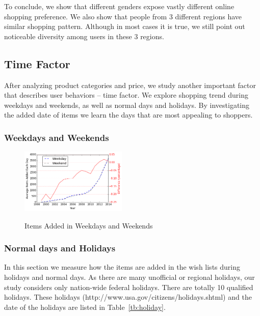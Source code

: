 To conclude, we show that different genders expose vastly different online shopping preference. We also show that people from 3 different regions have similar shopping pattern. Although in most cases it is true, we still point out noticeable diversity among users in these 3 regions. 

\subsection{Time Factor}
After analyzing product categories and price, we study another important factor that describes user behaviors -- time factor. We explore shopping trend during weekdays and weekends, as well as normal days and holidays. By investigating the added date of items we learn the days that are most appealing to shoppers. 

\subsubsection{Weekdays and Weekends}



\begin{figure}[h!]
\centering
  \caption{Items Added in Weekdays and Weekends}{}
  \label{fig:week}
  \centering
    \includegraphics[width=0.45\textwidth]{weekday.png}
\end{figure}

\subsubsection{Normal days and Holidays}

In this section we measure how the items are added in the wish lists during holidays and normal days. As there are many unofficial or regional holidays, our study considers only nation-wide federal holidays. There are totally 10 qualified holidays. These holidays (http://www.usa.gov/citizens/holidays.shtml) and the date of the holidays are listed in Table~\ref{tb:holiday}.

